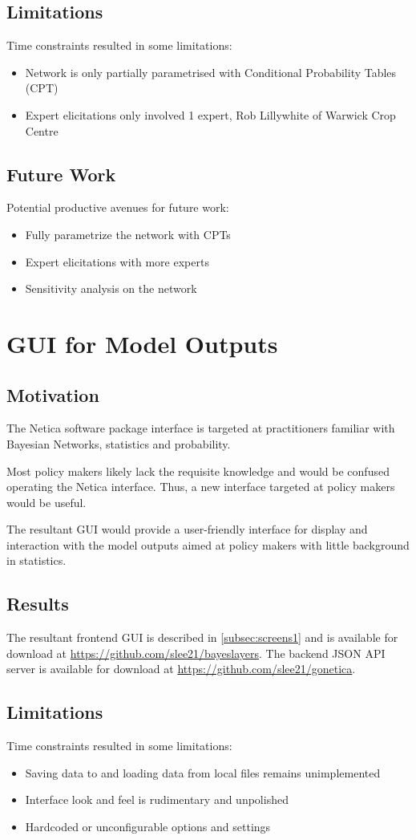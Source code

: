 \documentclass[12pt,notitlepage]{article}
\begin{document}
\begin{multicols}{2}
\subsection{Limitations}
Time constraints resulted in some limitations:
\begin{itemize}
\item Network is only partially parametrised with Conditional Probability Tables (CPT)
\item Expert elicitations only involved 1 expert, Rob Lillywhite of Warwick Crop Centre
\end{itemize}
\subsection{Future Work}
Potential productive avenues for future work:
\begin{itemize}
\item Fully parametrize the network with CPTs
\item Expert elicitations with more experts
\item Sensitivity analysis on the network
\end{itemize}
\section{GUI for Model Outputs}\label{sec:guidevel}
\subsection{Motivation}
The Netica software package interface is targeted at practitioners familiar with Bayesian Networks, statistics and probability. 

Most policy makers likely lack the requisite knowledge and would be confused operating the Netica interface. Thus, a new interface targeted at policy makers would be useful.

The resultant GUI would provide a user-friendly interface for display and interaction with the model outputs aimed at policy makers with little background in statistics.
\subsection{Results}
The resultant frontend GUI is described in \ref{subsec:screens1} and is available for download at \url{https://github.com/slee21/bayeslayers}. The backend JSON API server is available for download at \url{https://github.com/slee21/gonetica}.
\subsection{Limitations}
Time constraints resulted in some limitations:
\begin{itemize}
\item Saving data to and loading data from local files remains unimplemented
\item Interface look and feel is rudimentary and unpolished
\item Hardcoded or unconfigurable options and settings
\end{itemize}

\end{multicols}
\end{document}
